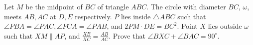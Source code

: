 Let $M$ be the midpoint of $BC$ of triangle $ABC$. The circle with diameter $BC$, $\omega$, meets $AB,AC$ at $D,E$ respectively. $P$ lies inside $\triangle ABC$ such that $\angle PBA=\angle PAC, \angle PCA=\angle PAB$, and $2PM\cdot DE=BC^2$. Point $X$ lies outside $\omega$ such that $XM\parallel AP$, and $\frac{XB}{XC}=\frac{AB}{AC}$. Prove that $\angle BXC +\angle BAC=90^{\circ}$.